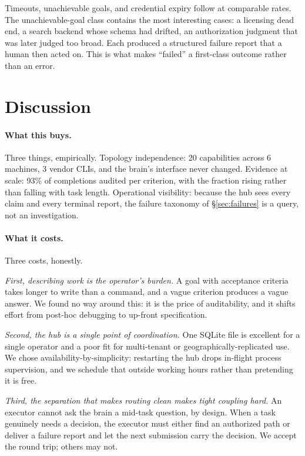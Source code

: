 \documentclass{article}
\begin{document}
Timeouts, unachievable goals, and credential expiry follow at comparable rates.
The unachievable-goal class contains the most interesting cases: a licensing dead end, a search backend whose
schema had drifted, an authorization judgment that was later judged too broad. Each
produced a structured failure report that a human then acted on. This is what makes
``failed'' a first-class outcome rather than an error.

\section{Discussion}
\label{sec:limits}

\paragraph{What this buys.} Three things, empirically. Topology independence: 20
capabilities across 6 machines, 3 vendor CLIs, and the brain's interface never
changed. Evidence at scale: 93\% of completions audited per criterion, with the
fraction rising rather than falling with task length. Operational visibility: because
the hub sees every claim and every terminal report, the failure taxonomy of
\S\ref{sec:failures} is a query, not an investigation.

\paragraph{What it costs.} Three costs, honestly.

\emph{First, describing work is the operator's burden.} A goal with acceptance
criteria takes longer to write than a command, and a vague criterion produces a
vague answer. We found no way around this: it is the price of auditability, and it
shifts effort from post-hoc debugging to up-front specification.

\emph{Second, the hub is a single point of coordination.} One SQLite file is
excellent for a single operator and a poor fit for multi-tenant or
geographically-replicated use. We chose availability-by-simplicity: restarting the
hub drops in-flight process supervision, and we schedule that outside working hours
rather than pretending it is free.

\emph{Third, the separation that makes routing clean makes tight coupling hard.}
An executor cannot ask the brain a mid-task question, by design. When a task genuinely
needs a decision, the executor must either find an authorized path or deliver a
failure report and let the next submission carry the decision. We accept the round
trip; others may not.
\end{document}
